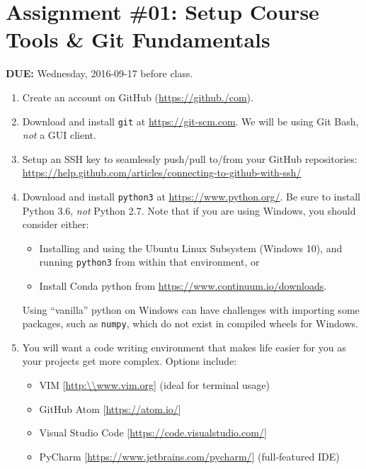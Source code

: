 


\section*{Assignment \#01: Setup Course Tools \& Git Fundamentals}

{\bf DUE:} Wednesday, 2016-09-17 before class.

\begin{enumerate}

\item Create an account on GitHub (\url{https://github./com}).

\item Download and install \verb+git+ at \url{https://git-scm.com}.  We will be
using Git Bash, \emph{not} a GUI client.

\item Setup an SSH key to seamlessly push/pull to/from your GitHub repositories:
\url{https://help.github.com/articles/connecting-to-github-with-ssh/}

\item Download and install \verb+python3+ at \url{https://www.python.org/}. Be sure to install Python 3.6, \emph{not} Python 2.7.
Note that if you are using Windows, you should consider either:
\begin{itemize}
  \item Installing and using the Ubuntu Linux Subsystem (Windows 10), and
  running \verb+python3+ from within that environment, or
  \item Install Conda python from \url{https://www.continuum.io/downloads}.
\end{itemize}
Using ``vanilla'' python on Windows can have challenges with importing some
packages, such as \verb+numpy+, which do not exist in compiled wheels for
Windows.

\item You will want a code writing environment that makes life easier for you as
your projects get more complex.  Options include:
\begin{itemize}
  \item VIM [\url{http:\\www.vim.org}] (ideal for terminal usage)
  \item GitHub Atom [\url{https://atom.io/}]
  \item Visual Studio Code [\url{https://code.visualstudio.com/}]
  \item PyCharm [\url{https://www.jetbrains.com/pycharm/}]  (full-featured IDE)
\end{itemize}


\end{enumerate}
